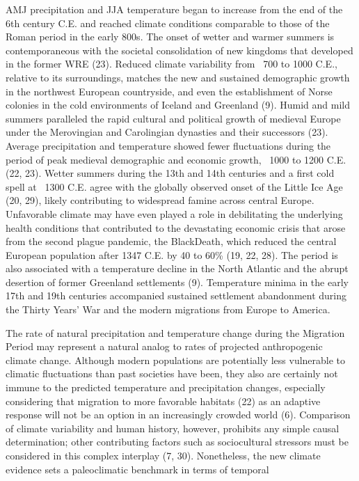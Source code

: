 \documentclass[10pt,a4paper,twoside,onecolumn]{article}
\begin{document}
\begin{myfont}
\begin{multicols}{3}
AMJ precipitation and JJA temperature began to increase from the end of the 6th century C.E. and reached climate conditions comparable to those of the Roman period in the early 800s. The onset of wetter and warmer summers is contemporaneous with the societal consolidation of new kingdoms that developed in the
former WRE (23). Reduced climate variability from ~700 to 1000 C.E., relative to its surroundings, matches the new and sustained demographic growth in the northwest European countryside, and even the establishment of Norse colonies in the cold environments of Iceland and Greenland (9). Humid and mild summers paralleled the rapid cultural and political growth of medieval Europe under the Merovingian and Carolingian dynasties and their successors (23). Average precipitation and temperature showed fewer fluctuations during the period of peak medieval demographic and economic growth, ~1000 to 1200 C.E. (22, 23). Wetter summers during the 13th and 14th centuries and a first cold spell at ~1300 C.E. agree with the globally observed onset of the Little Ice Age (20, 29),
likely contributing to widespread famine across central Europe. Unfavorable climate may have even played a role in debilitating the underlying
health conditions that contributed to the devastating economic crisis that arose from the second plague pandemic, the BlackDeath, which reduced the central European population after 1347 C.E. by 40 to 60\% (19, 22, 28). The period is also associated with a temperature decline in the North Atlantic and the abrupt desertion of former Greenland settlements (9). Temperature minima in the early 17th and 19th centuries accompanied sustained settlement abandonment
during the Thirty Years’ War and the modern migrations from Europe to America. \par
The rate of natural precipitation and temperature change during the Migration Period may represent a natural analog to rates of projected
anthropogenic climate change. Although modern populations are potentially less vulnerable to climatic fluctuations than past societies
have been, they also are certainly not immune to the predicted temperature and precipitation changes, especially considering that migration
to more favorable habitats (22) as an adaptive response will not be an option in an increasingly crowded world (6). Comparison of climate
variability and human history, however, prohibits any simple causal determination; other contributing factors such as sociocultural stressors
must be considered in this complex interplay (7, 30). Nonetheless, the new climate evidence sets a paleoclimatic benchmark in terms of temporal

\end{multicols}
\end{myfont}
\end{document}
